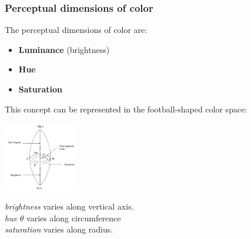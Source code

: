 \documentclass[a4paper, fontsize=8pt, landscape, DIV=1]{scrartcl}
\begin{document}
\begin{multicols*}{4}
		\subsubsection{Perceptual dimensions of color}
		The perceptual dimensions of color are: 
		\begin{itemize}[noitemsep]
			\item \textbf{Luminance} (brightness)
			\item \textbf{Hue}
			\item \textbf{Saturation}
		\end{itemize}
		This concept can be represented in the football-shaped color space: 
		\begin{minipage}[b]{0.49\columnwidth}
			\begin{flushleft}
				\includegraphics[width=\columnwidth, height=3cm]{images/FeatureExt/color_football.png}\\
			\end{flushleft}
		\end{minipage}
		\begin{minipage}[b]{0.49\columnwidth}
			\begin{flushleft}
				\textit{brightness} varies along vertical axis.\\
				\textit{hue} $\theta$ varies along circumference\\
				\textit{saturation} varies along radius.
				\vspace{0.5cm}
			\end{flushleft}
		\end{minipage}
		

\end{multicols*}
\end{document}

